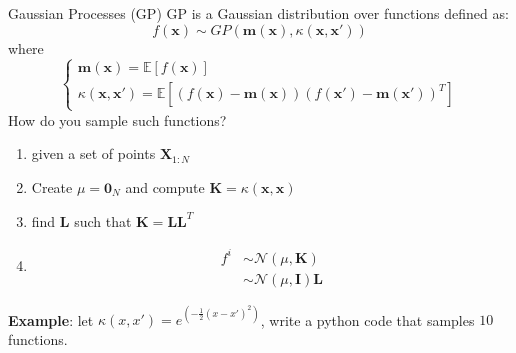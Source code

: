 \documentclass[10pt]{beamer}
\begin{document}
\begin{frame}{Gaussian Processes (GP)}
	GP is a Gaussian distribution over functions defined as: 
	$$ f(\mathbf{x})  \sim GP (\mathbf{m}(\mathbf{x}), \kappa (\mathbf{x}, \mathbf{x}'))$$
	where 
	$$ \begin{cases}
		\mathbf{m}(\mathbf{x}) = \mathbb{E} [f(\mathbf{x})] \\ 
		\kappa (\mathbf{x}, \mathbf{x}') = \mathbb{E} \left[(f(\mathbf{x}) - \mathbf{m}(\mathbf{x}))(f(\mathbf{x}') - \mathbf{m}(\mathbf{x}'))^T\right]
	\end{cases}$$
	How do you sample such functions? 
	\begin{enumerate}
		\item given a set of points $\mathbf{X}_{1:N}$
		\item Create $\mu = \bm{0}_N$ and compute $\mathbf{K} =  \kappa (\mathbf{x}, \mathbf{x})$
		\item find $\mathbf{L}$ such that $\mathbf{K} = \mathbf{L}\mathbf{L}^T$
		\item \begin{align*}
			f^i &\sim \mathcal{N}(\mu, \mathbf{K})\\ 
			&\sim \mathcal{N}(\mu, \mathbf{I}) \mathbf{L}
		\end{align*}
	\end{enumerate}
	\textbf{Example}: let $\kappa (x, x') = e^{\left(-\frac{1}{2} (x-x')^2\right)}$, write a python code that samples $10$ functions.
\end{frame}



%	
\end{document}
